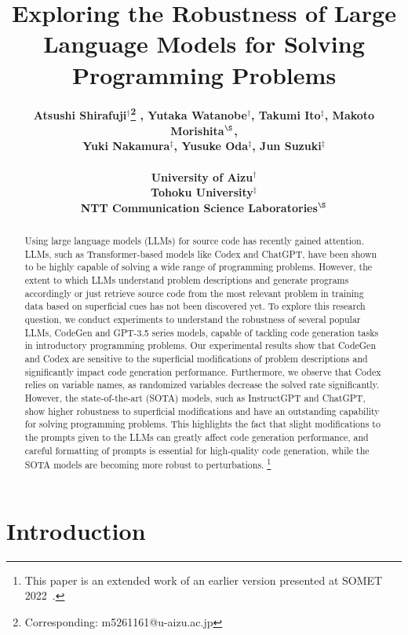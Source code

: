 \documentclass{article}
\title{Exploring the Robustness of Large Language Models for Solving Programming Problems}
\author{%
\bf Atsushi Shirafuji$^\dag$\thanks{Corresponding: m5261161@u-aizu.ac.jp} , Yutaka Watanobe$^{\dag}$, Takumi Ito$^\ddag$, Makoto Morishita$^\S$, \\
\bf Yuki Nakamura$^\ddag$, Yusuke Oda$^\ddag$, Jun Suzuki$^\ddag$ \\
\\
University of Aizu$^\dag$\\
Tohoku University$^\ddag$\\
NTT Communication Science Laboratories$^\S$
}
\begin{document}
\maketitle


\begin{abstract}
Using large language models (LLMs) for source code has recently gained attention. LLMs, such as Transformer-based models like Codex and ChatGPT, have been shown to be highly capable of solving a wide range of programming problems.
However, the extent to which LLMs understand problem descriptions and generate programs accordingly or just retrieve source code from the most relevant problem in training data based on superficial cues has not been discovered yet.
To explore this research question, we conduct experiments to understand the robustness of several popular LLMs, CodeGen and GPT-3.5 series models, capable of tackling code generation tasks in introductory programming problems.
Our experimental results show that CodeGen and Codex are sensitive to the superficial modifications of problem descriptions and significantly impact code generation performance.
Furthermore, we observe that Codex relies on variable names, as randomized variables decrease the solved rate significantly.
However, the state-of-the-art (SOTA) models, such as InstructGPT and ChatGPT, show higher robustness to superficial modifications and have an outstanding capability for solving programming problems.
This highlights the fact that slight modifications to the prompts given to the LLMs can greatly affect code generation performance, and careful formatting of prompts is essential for high-quality code generation, while the SOTA models are becoming more robust to perturbations.
\footnote{This paper is an extended work of an earlier version presented at SOMET 2022~\citep{shirafuji2022prompt}.}
\end{abstract}



\section{Introduction}
\label{sec:introduction}
\end{document}
